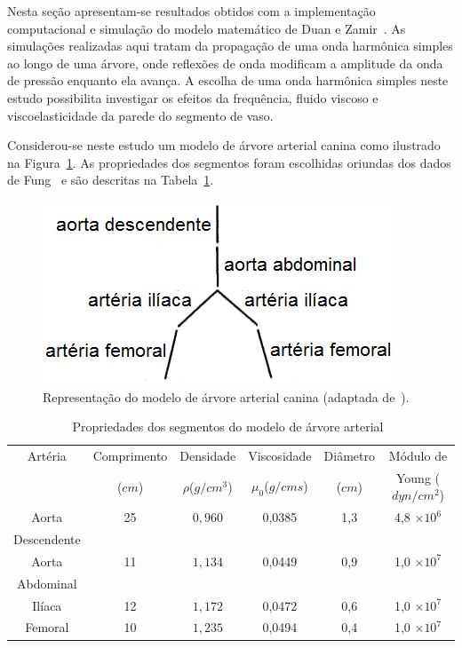 \documentclass[
        english,			
        brazil			        %
        ,<...>]{abntbibufjf}
\begin{document}
Nesta seção apresentam-se resultados obtidos com a implementação computacional e simulação do modelo matemático de Duan e Zamir~\cite{Duan}. As simulações realizadas aqui tratam da propagação de uma onda harmônica simples ao longo de uma árvore, onde reflexões de onda modificam a amplitude da onda de pressão enquanto ela avança. A escolha de uma onda harmônica simples neste estudo possibilita investigar os efeitos da frequência, fluido viscoso e viscoelasticidade da parede do segmento de vaso.

Considerou-se neste estudo um modelo de árvore arterial canina como ilustrado na Figura~\ref{fig:arvore-canina}. As propriedades dos segmentos foram escolhidas oriundas dos dados de Fung~\cite{Fung} e são descritas na Tabela~\ref{tab1:proprerty}. 

\begin{figure}[!htbp]
	\centering
	\includegraphics[scale=0.8]{Figures/tree_canine.png}
	\caption{Representação do modelo de árvore arterial canina (adaptada de~\cite{Duan}).}
	\label{fig:arvore-canina}
\end{figure}

\begin{table}[!htbp]
	\caption{Propriedades dos segmentos do modelo de árvore arterial~\cite{Duan,Fung}}
	\centering{}
	\begin{tabular}{|c||c|c|c|c|c|}
		\hline 
		Artéria	& Comprimento & Densidade & Viscosidade  & Diâmetro & Módulo de  \\ 
		& ($cm$) & $\rho$($g/cm^3$) & $\mu_0$($g/cm s$) & ($cm$) & Young ($dyn/cm^2$) \\ 
		\hline
		\hline 
		Aorta & 25 & $0,960$ & 0,0385 & 1,3 &4,8 $\times 10^6$ \\ 
		Descendente &  & &  & & \\ 
		\hline 
		Aorta & 11 & $1,134$ & 0,0449 & 0,9 & 1,0 $\times 10^7$ \\
		Abdominal &  & &  & &  \\ 
		\hline 
		Ilíaca & 12 & $1,172$ & 0,0472 & 0,6 & 1,0 $\times 10^7$\\ 
		\hline 
		Femoral & 10 & $1,235$ & 0,0494 & 0,4 & 1,0 $\times 10^7$\\ 
		\hline 
	\end{tabular} 
	\label{tab1:proprerty}
\end{table}
\end{document}
